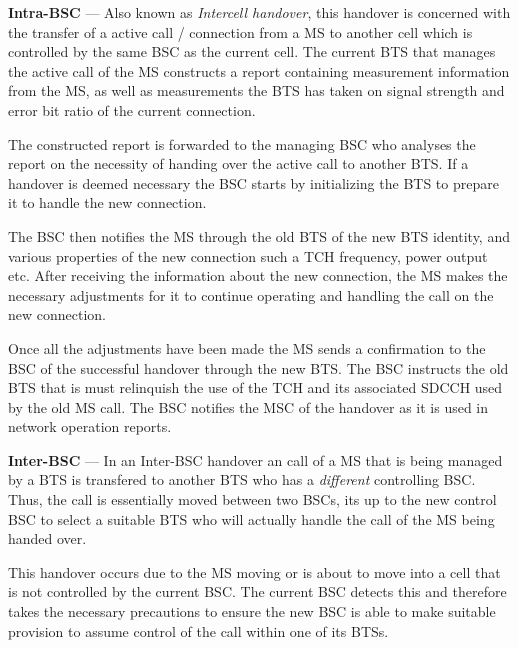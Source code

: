 \begin{description}
\item{\textbf{Intra-BSC}} --- Also known as \emph{Intercell handover}, this handover is concerned with the transfer of a active call / connection from a MS to another cell which is controlled by the same BSC as the current cell. The current BTS that manages the active call of the MS constructs a report containing measurement information from the MS, as well as measurements the BTS has taken on signal strength and error bit ratio of the current connection\cite{wirelesstelcoMullet,GSMArchitectureProtocolsServices}. 

The constructed report is forwarded to the managing BSC who analyses the report on the necessity of handing over the active call to another BTS. If a handover is deemed necessary the BSC starts by initializing the BTS to prepare it to handle the new connection\cite{wirelesstelcoMullet,GSMArchitectureProtocolsServices}.

The BSC then notifies the MS through the old BTS of the new BTS identity, and various properties of the new connection such a TCH frequency, power output etc. After receiving the information about the new connection, the MS makes the necessary adjustments for it to continue operating and handling the call on the new connection\cite{wirelesstelcoMullet,GSMArchitectureProtocolsServices}. 

Once all the adjustments have been made the MS sends a confirmation to the BSC of the successful handover through the new BTS. The BSC instructs the old BTS that is must relinquish the use of the TCH and its associated SDCCH used by the old MS call. The BSC notifies the MSC of the handover as it is used in network operation reports\cite{wirelesstelcoMullet,GSMArchitectureProtocolsServices}.
\item{\textbf{Inter-BSC}} --- In an Inter-BSC handover an call of a MS that is being managed by a BTS is transfered to another BTS who has a \emph{different} controlling BSC. Thus, the call is essentially moved between two BSCs, its up to the new control BSC to select a suitable BTS who will actually handle the call of the MS being handed over\cite{wirelesstelcoMullet,GSMArchitectureProtocolsServices}.

This handover occurs due to the MS moving or is about to move into a cell that is not controlled by the current BSC. The current BSC detects this and therefore takes the necessary precautions to ensure the new BSC is able to make suitable provision to assume control of the call within one of its BTSs\cite{wirelesstelcoMullet,GSMArchitectureProtocolsServices}.


\end{description}
